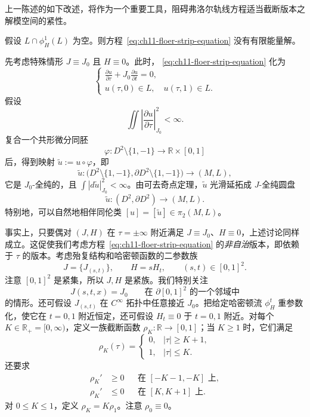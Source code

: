 上一陈述的如下改述，将作为一个重要工具，阻碍弗洛尔轨线方程适当截断版本之解模空间的紧性。

\begin{corollary}\label{cor:ch11-disjoint-no-finite-energy-strip}
假设 $L\cap\phi_H^1(L)$ 为空。则方程~\eqref{eq:ch11-floer-strip-equation} 没有有限能量解。
\end{corollary}

先考虑特殊情形 $J\equiv J_0$ 且 $H\equiv0$。此时，
\eqref{eq:ch11-floer-strip-equation} 化为
\begin{equation}
 \begin{cases}
  \displaystyle\frac{\partial u}{\partial\tau}
  +J_0\frac{\partial u}{\partial t}=0,\\[5pt]
  u(\tau,0)\in L,\quad u(\tau,1)\in L.
 \end{cases}
 \label{eq:ch11-unperturbed-strip-equation}
\end{equation}
假设
\[
 \iint\left|\frac{\partial u}{\partial\tau}\right|_{J_0}^2<\infty.
\]
复合一个共形微分同胚
\[
 \varphi:D^2\setminus\{1,-1\}\longrightarrow\mathbb R\times[0,1]
\]
后，得到映射 $\widetilde u:=u\circ\varphi$，即
\[
 \widetilde u:
 \bigl(D^2\setminus\{1,-1\},
 \partial D^2\setminus\{1,-1\}\bigr)\longrightarrow(M,L),
\]
它是 $J_0$-全纯的，且 $\int|d\widetilde u|_{J_0}^2<\infty$。由可去奇点定理，$\widetilde u$ 光滑延拓成 $J$-全纯圆盘
\[
 \widetilde u:(D^2,\partial D^2)\longrightarrow(M,L).
\]
特别地，可以自然地相伴同伦类
$[u]=[\widetilde u]\in\pi_2(M,L)$。

事实上，只要偶对 $(J,H)$ 在 $\tau=\pm\infty$ 附近满足
$J\equiv J_0$、$H\equiv0$，上述讨论同样成立。这促使我们考虑方程~\eqref{eq:ch11-floer-strip-equation} 的\emph{非自治}版本，即依赖于 $\tau$ 的版本。考虑殆复结构和哈密顿函数的二参数族
\[
 J=\{J_{(s,t)}\},
 \qquad H=sH_t,
 \qquad(s,t)\in[0,1]^2.
\]
注意 $[0,1]^2$ 是紧集，所以 $J,H$ 是紧族。我们特别关注
\[
 J(s,t,x)=J_0
 \qquad\text{在 }\partial[0,1]^2\text{ 的一个邻域中}
\]
的情形。还可假设 $J_{(s,t)}$ 在 $C^\infty$ 拓扑中任意接近 $J_0$。把给定哈密顿流 $\phi_H^t$ 重参数化，使它在 $t=0,1$ 附近恒定，还可假设
$H_t\equiv0$ 于 $t=0,1$ 附近。对每个
$K\in\mathbb R_+=[0,\infty)$，定义一族截断函数
$\rho_K:\mathbb R\to[0,1]$；当 $K\geq1$ 时，它们满足
\begin{equation}
 \rho_K(\tau)=
 \begin{cases}
  0,&|\tau|\geq K+1,\\
  1,&|\tau|\leq K.
 \end{cases}
 \label{eq:ch11-cutoff-values}
\end{equation}
还要求
\begin{equation}
 \begin{aligned}
  \rho_K'&\geq0&&\text{在 }[-K-1,-K]\text{ 上},\\
  \rho_K'&\leq0&&\text{在 }[K,K+1]\text{ 上}.
 \end{aligned}
 \label{eq:ch11-cutoff-derivative-signs}
\end{equation}
对 $0\leq K\leq1$，定义 $\rho_K=K\rho_1$。注意 $\rho_0\equiv0$。

